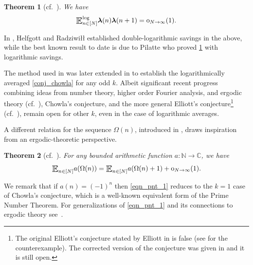 \documentclass[letter,11pt]{article}
\theoremstyle{plain} %
\newtheorem{theorem}{Theorem}[section]
\theoremstyle{definition} %
\theoremstyle{plain}
\theoremstyle{plain}
\theoremstyle{plain}
\numberwithin{equation}{section}
\newcommand{\Radziwill}{Radziwi\l\l{}}
\newcommand{\Oh}{{\mathrm O}}
\newcommand{\oh}{{\mathrm o}}
\newcommand{\N}{\mathbb{N}}
\newcommand{\C}{\mathbb{C}}
\newcommand{\lio}{\boldsymbol{\lambda}}
\newcommand{\edit}[3]{\color{#1}{#3}\color{black}\marginpar{\textcolor{#1}{[[#2]]}}}
\newcommand{\fkr}[1]{\edit{red}{FR}{#1}}
\newcommand{\E}{\raisebox{-0.4ex}{\scalebox{1.4}[1.3]{$\mathbb{E}$}}}
\newcommand{\Esub}[1]{\raisebox{-0.4ex}{\scalebox{1.4}[1.3]{$\mathbb{E}$}}\raisebox{-0.35ex}{\ensuremath{_{\scriptstyle #1}}}}
\newcommand{\logE}{{\E}^{\log}}
\newcommand{\1}{\mathbbm{1}}
\begin{document}
\begin{theorem}[{cf.~\cite[Theorem 2]{Tao16}}]\label{thm_log_2_correlation_chowla}
We have
\[
\logE_{n\in[N]} \lio(n)\lio(n+1)= \oh_{N\to\infty}(1).
\]
\end{theorem}

In \cite{helf_radz}, Helfgott and \Radziwill{} established double-logarithmic savings in the above, while the best known result to date is due to Pilatte \cite{pilatte2023improved} who proved \cref{thm_log_2_correlation_chowla} with logarithmic savings.

The method used in \cite{Tao16} was later extended in \cite{TT18} to establish the logarithmically averaged \ref{conj_chowla} for any odd  $k$. 
Albeit significant recent progress combining ideas from number theory, higher order Fourier analysis, and ergodic theory (cf.\ \cite{Sarnak11,EAKLdlR17,Frantzikinakis17,tao2017equivalence,FH18a,FKL18,GLdlR21,KMT23_almost_all_scales,MRTT2023_higher_uniformity,MSTT2023,KLRT2024,MRSTT2024}),
Chowla's conjecture, and the more general Elliott's conjecture\footnote{The original Elliott's conjecture stated by Elliott in \cite{Elliott92} is false (see \cite[Theorem B.1]{MRT15} for the counterexample). The corrected version of the conjecture was given in \cite{MRT15} and it is still open.} (cf.~\cite{Elliott92,MRT15}), remain open for other $k$, even in the case of logarithmic averages.



A different relation for the sequence $\Omega(n)$, introduced in \cite{Richter_PNT_21}, draws inspiration from an ergodic-theoretic perspective.

\begin{theorem}[cf.~{\cite{Richter_PNT_21}}]
\label{thm_Omega_is_good_for_UE}
For any bounded arithmetic function $a\colon\N\to\C$, we have
\begin{equation}
\label{eqn_pnt_1}
\Esub{n\in[N]} a(\Omega(n)) = \Esub{n\in[N]} a(\Omega(n)+1) +\oh_{N\to\infty}(1).
\end{equation}
\end{theorem}
We remark that if $a(n)=(-1)^n$ then \eqref{eqn_pnt_1} reduces to the $k=1$ case of Chowla's conjecture, %
which is a well-known equivalent form of the Prime Number Theorem.
For generalizations of \eqref{eqn_pnt_1} and its connections to ergodic theory see~\cite{BR22,Loyd23, Charamaras_MVT_24}. 
\end{document}
